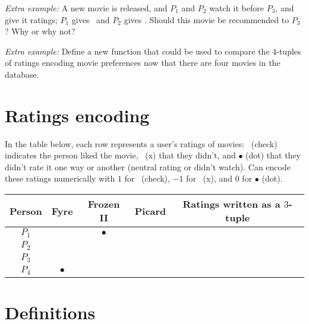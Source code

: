 \documentclass[12pt, oneside]{article}
\newcommand{\cmark}{\ding{51}}
\newcommand{\xmark}{\ding{55}}
\begin{document}
\vfill
\vfill


{\it Extra example:} A new movie is released, and $P_1$ and $P_2$ watch it before $P_3$, and give it
ratings; $P_1$ gives \cmark~and $P_2$ gives \xmark.
Should this movie be recommended to $P_3$? Why or why not?

{\it Extra example:} Define a new function that could be used to compare the $4$-tuples of ratings encoding
movie preferences now that there are four movies in the database.

\vfill
\newpage \vfill
\section*{Ratings encoding}


In the table  below,  each row represents a user's ratings of movies: 
\cmark~(check) indicates the person liked the movie, \xmark~(x)
that they didn't, and $\bullet$ (dot) that they didn't rate it one way or 
another (neutral rating or didn't watch). Can encode
these ratings numerically with $1$ for \cmark~(check), $-1$ for \xmark~(x), 
and $0$ for $\bullet$ (dot).

\begin{center}
\begin{tabular}{c|ccc||c}
Person & Fyre & Frozen II & Picard & Ratings written as a  $3$-tuple\\
\hline
$P_1$     & \xmark & $\bullet$ & \cmark & \phantom{$(-1, 0, 1)$} \\
$P_2$     & \cmark & \cmark & \xmark & \phantom{$(1, 1, -1)$} \\
$P_3$     & \cmark & \cmark & \cmark & \phantom{$(1, 1, 1)$} \\
$P_4$     & $\bullet$ & \xmark & \cmark &  \\
\end{tabular}
\end{center} \vfill
\section*{Definitions}
\end{document}
